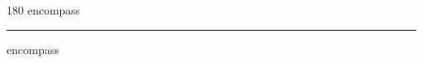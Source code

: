 
\begin{frame}
\begin{center}
\begin{turn}{180}
{\fontsize{2.5cm}{1em}\selectfont encompass}
\end{turn}
\vspace{1em}\par  
\hrule
\vspace{1em}\par  
{\fontsize{2.5cm}{1em}\selectfont encompass}
\end{center}
\end{frame}
